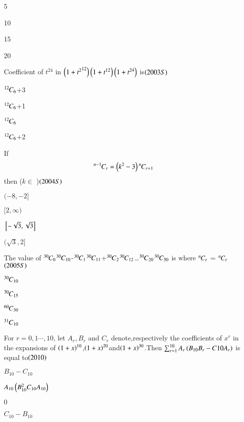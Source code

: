 \documentclass[journal,12pt,onecolumn]{IEEEtran}
\theoremstyle{remark}
\begin{document}
\begin{enumerate}
{\begin{enumerate}
\begin{multicols}{2}
    \item5 
    \item10
    \item15
    \item 20
    \end{multicols}
\end{enumerate}
\item Coefficient of $t^{24}$ in $\left({1+t^2}^{12}\right)\left(1+t^{12}\right)\left(1+t^{24}\right)$ is{\hfill$\left(2003S\right)$}
\begin{enumerate}
\begin{multicols}{2}
\item ${{}^{12}\mkern-1muC_{6}}$+3
\item ${{}^{12}\mkern-1muC_{6}}$+1 
\item ${{}^{12}\mkern-1muC_{6}}$
\item ${{}^{12}\mkern-1muC_{6}}$+2\end{multicols}
\end{enumerate}
\item If 
\begin{align}
{{}^{n-1}\mkern-1muC_{r}} &= \left(k^2-3\right) {{}^{n}\mkern-1muC_{r+1}} \notag
\end{align}
then ($k \in $ )\hfill{$\left(2004S\right)$}

\begin{enumerate}
\begin{multicols}{2}
    \item $(-8,-2]$
    \item $[2,\infty)$
    \item${}\left[-\sqrt{3},\sqrt{3}\right]$
    \item$(\sqrt{3},2]$
    \end{multicols}
\end{enumerate}

\item The value of
	${{}^{30}\mkern-1muC_{0}}$${{}^{30}\mkern-1muC_{10}}$-${{}^{30}\mkern-1muC_{1}}$${{}^{30}\mkern-1muC_{11}}$+${{}^{30}\mkern-1muC_{2}}$${{}^{30}\mkern-1muC_{12}}$\dots${{}^{30}\mkern-1muC_{20}}$${{}^{30}\mkern-1muC_{30}}$ is where ${{}^{n}\mkern-1muC_{r}}$ = ${{}^{n}\mkern-1muC_{r}}${\hfill$\left(2005S\right)$}
\begin{enumerate}
\begin{multicols}{2}
\item${{}^{30}\mkern-1muC_{10}}$ 
\item${{}^{30}\mkern-1muC_{15}}$
\item${{}^{60}\mkern-1muC_{30}}$ 
\item${{}^{31}\mkern-1muC_{10}}$
\end{multicols}
\end{enumerate}
\item For $r=0,1\cdots,10$, let $A_r,B_r$ and $C_r$ denote,respectively the coefficients of $x^r$ in the expansions of $\left(1+x\right)^{10}$,$\left(1+x\right)^{20}$and$\left(1+x\right)^{30}$.Then $\sum_{r=1}^{10}A_r\left(B_{10}B_r-C{10}A_r\right)$ is equal to{\hfill$\left(2010\right)$}
\begin{enumerate}
 \begin{multicols}{2}
 \item $B_{10}-C_{10}$ 
 \item $A_{10}\left(B_{10}^2C_{10}A_{10}\right)$ 
 \item $0$
 \item $C_{10}-B_{10}$
 \end{multicols}
\end{enumerate}

}
\end{enumerate}
\end{document}
